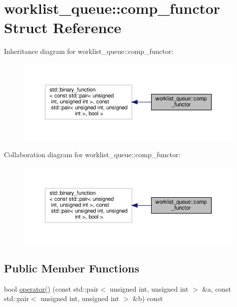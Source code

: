 \hypertarget{structworklist__queue_1_1comp__functor}{}\section{worklist\+\_\+queue\+:\+:comp\+\_\+functor Struct Reference}
\label{structworklist__queue_1_1comp__functor}


Inheritance diagram for worklist\+\_\+queue\+:\+:comp\+\_\+functor\+:
\nopagebreak
\begin{figure}[H]
\begin{center}
\leavevmode
\includegraphics[width=350pt]{db/dbb/structworklist__queue_1_1comp__functor__inherit__graph}
\end{center}
\end{figure}


Collaboration diagram for worklist\+\_\+queue\+:\+:comp\+\_\+functor\+:
\nopagebreak
\begin{figure}[H]
\begin{center}
\leavevmode
\includegraphics[width=350pt]{d3/d93/structworklist__queue_1_1comp__functor__coll__graph}
\end{center}
\end{figure}
\subsection*{Public Member Functions}
\begin{DoxyCompactItemize}
\item 
bool \hyperlink{structworklist__queue_1_1comp__functor_ae1123c54f73d732c0e418a8d356d3c38}{operator()} (const std\+::pair$<$ unsigned int, unsigned int $>$ \&a, const std\+::pair$<$ unsigned int, unsigned int $>$ \&b) const
\end{DoxyCompactItemize}


